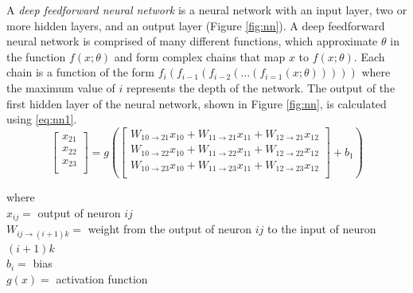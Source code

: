A \textit{deep feedforward neural network} is a neural network with an input layer, two or more hidden layers, and an output layer (Figure \ref{fig:nn}).
A deep feedforward neural network is comprised of many different functions, which approximate $\theta$ in the function $f(x;\theta)$ and form complex chains that map $x$ to $f(x;\theta)$.
Each chain is a function of the form $f_{i}(f_{i - 1}(f_{i - 2}(... (f_{i = 1}(x;\theta)))))$ where the maximum value of $i$ represents the depth of the network.
The output of the first hidden layer of the neural network, shown in Figure \ref{fig:nn}, is calculated using \ref{eq:nn1}.
%
\begin{equation}
  \label{eq:nn1}
  \left[
  \begin{matrix}
    x_{21} \\
    x_{22} \\
    x_{23} \\
  \end{matrix}
  \right] = g
  \left(
  \left[
  \begin{matrix}
    W_{10 \rightarrow 21} x_{10} + W_{11 \rightarrow 21} x_{11} + W_{12 \rightarrow 21} x_{12} \\
    W_{10 \rightarrow 22} x_{10} + W_{11 \rightarrow 22} x_{11} + W_{12 \rightarrow 22} x_{12} \\
    W_{10 \rightarrow 23} x_{10} + W_{11 \rightarrow 23} x_{11} + W_{12 \rightarrow 23} x_{12} \\
  \end{matrix}
  \right] + b_{1}
  \right)
\end{equation}

\noindent where \\
\indent $x_{ij} = $ output of neuron $ij$ \\
\indent $W_{ij \rightarrow (i + 1)k} = $ weight from the output of neuron $ij$ to the input of neuron $(i + 1)k$ \\
\indent $b_{i} = $ bias \\
\indent $g(x) = $ activation function \\

